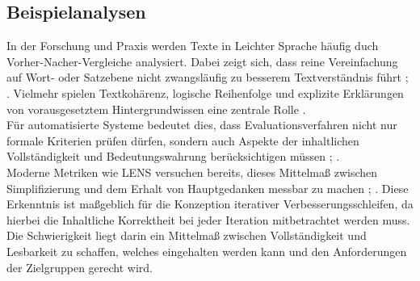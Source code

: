 \subsection{Beispielanalysen}
In der Forschung und Praxis werden Texte in Leichter Sprache häufig duch Vorher-Nacher-Vergleiche analysiert.
Dabei zeigt sich, dass reine Vereinfachung auf Wort- oder Satzebene nicht zwangsläufig zu besserem Textverständnis führt \cite{DINSPEC334292019}; \cite[S. 254]{maas_handbuch_2018}.
Vielmehr spielen Textkohärenz, logische Reihenfolge und explizite Erklärungen von vorausgesetztem Hintergrundwissen eine zentrale Rolle \cite{DINSPEC334292019}.\\
Für automatisierte Systeme bedeutet dies, dass Evaluationsverfahren nicht nur formale Kriterien prüfen dürfen, sondern auch Aspekte der inhaltlichen Vollständigkeit und Bedeutungswahrung berücksichtigen müssen \cite[147]{alva-manchego_data-driven_2020}; \cite[1 Introduction]{maddela_lens_2023}. \\
Moderne Metriken wie LENS versuchen bereits, dieses Mittelmaß zwischen Simplifizierung und dem Erhalt von Hauptgedanken messbar zu machen \cite[1 Introduction]{maddela_lens_2023}; \cite[S. 404]{xu_optimizing_2016}.
Diese Erkenntnis ist maßgeblich für die Konzeption iterativer Verbesserungsschleifen, da hierbei die Inhaltliche Korrektheit bei jeder Iteration mitbetrachtet werden muss.
Die Schwierigkeit liegt darin ein Mittelmaß zwischen Vollständigkeit und Lesbarkeit zu schaffen, welches eingehalten werden kann und den Anforderungen der Zielgruppen gerecht wird.

